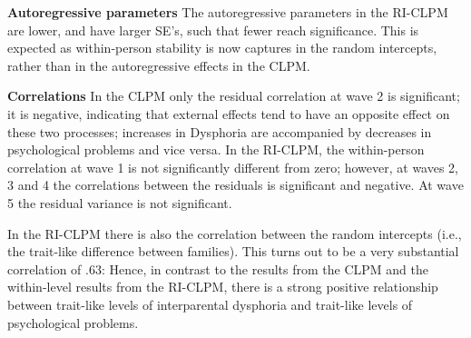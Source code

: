 \documentclass[
]{book}
\begin{document}
\textbf{Autoregressive parameters}
The autoregressive parameters in the RI-CLPM are lower, and have larger SE's, such that fewer reach significance. This is expected as within-person stability is now captures in the random intercepts, rather than in the autoregressive effects in the CLPM.

\textbf{Correlations}
In the CLPM only the residual correlation at wave 2 is significant; it is negative, indicating that external effects tend to have an opposite effect on these two processes; increases in Dysphoria are accompanied by decreases in psychological problems and vice versa. In the RI-CLPM, the within-person correlation at wave 1 is not significantly different from zero; however, at waves 2, 3 and 4 the correlations between the residuals is significant and negative. At wave 5 the residual variance is not significant.

In the RI-CLPM there is also the correlation between the random intercepts (i.e., the trait-like difference between families). This turns out to be a very substantial correlation of .63: Hence, in contrast to the results from the CLPM and the within-level results from the RI-CLPM, there is a strong positive relationship between trait-like levels of interparental dysphoria and trait-like levels of psychological problems.
\end{document}
